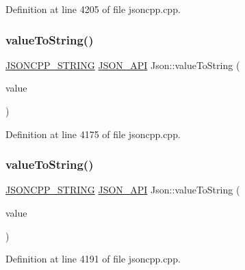 Definition at line 4205 of file jsoncpp.\+cpp.

\hypertarget{namespace_json_a77501ed00903d1b183a55a5fbf6b749a}{}\label{namespace_json_a77501ed00903d1b183a55a5fbf6b749a} 
\subsubsection{\texorpdfstring{value\+To\+String()}{valueToString()}\hspace{0.1cm}{\footnotesize\ttfamily [3/6]}}
{\footnotesize\ttfamily \hyperlink{config_8h_a1e723f95759de062585bc4a8fd3fa4be}{J\+S\+O\+N\+C\+P\+P\+\_\+\+S\+T\+R\+I\+NG} \hyperlink{config_8h_a1d61ffde86ce1a18fd83194ff0d9a206}{J\+S\+O\+N\+\_\+\+A\+PI} Json\+::value\+To\+String (\begin{DoxyParamCaption}\item[{\hyperlink{namespace_json_a218d880af853ce786cd985e82571d297}{Largest\+Int}}]{value }\end{DoxyParamCaption})}



Definition at line 4175 of file jsoncpp.\+cpp.

\hypertarget{namespace_json_a9a0432e5ac3dd69b6c7f29db7776ef21}{}\label{namespace_json_a9a0432e5ac3dd69b6c7f29db7776ef21} 
\subsubsection{\texorpdfstring{value\+To\+String()}{valueToString()}\hspace{0.1cm}{\footnotesize\ttfamily [4/6]}}
{\footnotesize\ttfamily \hyperlink{config_8h_a1e723f95759de062585bc4a8fd3fa4be}{J\+S\+O\+N\+C\+P\+P\+\_\+\+S\+T\+R\+I\+NG} \hyperlink{config_8h_a1d61ffde86ce1a18fd83194ff0d9a206}{J\+S\+O\+N\+\_\+\+A\+PI} Json\+::value\+To\+String (\begin{DoxyParamCaption}\item[{\hyperlink{namespace_json_ae202ecad69725e23443f465e257456d0}{Largest\+U\+Int}}]{value }\end{DoxyParamCaption})}



Definition at line 4191 of file jsoncpp.\+cpp.

\hypertarget{namespace_json_aa99b8b8dc736259e5a229a4e61d7ea92}{}\label{namespace_json_aa99b8b8dc736259e5a229a4e61d7ea92} 
